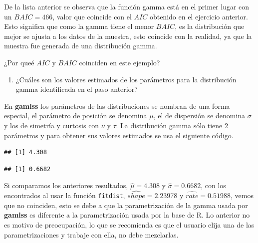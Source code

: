\documentclass[10pt,]{krantz}
\makeatletter
\newenvironment{Shaded}{\begin{snugshade}}{\end{snugshade}}
\newcommand{\NormalTok}[1]{{#1}}
\providecommand{\tightlist}{%
  \setlength{\itemsep}{0pt}\setlength{\parskip}{0pt}}
\let\proglang=\textsf
\newenvironment{kframe}{%
\medskip{}
\setlength{\fboxsep}{.8em}
 \def\at@end@of@kframe{}%
 \ifinner\ifhmode%
  \def\at@end@of@kframe{\end{minipage}}%
  \begin{minipage}{\columnwidth}%
 \fi\fi%
 \def\FrameCommand##1{\hskip\@totalleftmargin \hskip-\fboxsep
 \colorbox{shadecolor}{##1}\hskip-\fboxsep
     \hskip-\linewidth \hskip-\@totalleftmargin \hskip\columnwidth}%
 \MakeFramed {\advance\hsize-\width
   \@totalleftmargin\z@ \linewidth\hsize
   \@setminipage}}%
 {\par\unskip\endMakeFramed%
 \at@end@of@kframe}
\renewenvironment{Shaded}{\begin{kframe}}{\end{kframe}}
\makeatother
\begin{document}
De la lista anterior se observa que la función gamma está en el primer
lugar con un \(BAIC=466\), valor que coincide con el \(AIC\) obtenido en
el ejercicio anterior. Esto significa que como la gamma tiene el menor
\(BAIC\), es la distribución que mejor se ajusta a los datos de la
muestra, esto coincide con la realidad, ya que la muestra fue generada
de una distribución gamma.

¿Por queé \(AIC\) y \(BAIC\) coinciden en este ejemplo?

\begin{enumerate}
\def\labelenumi{\arabic{enumi})}
\setcounter{enumi}{1}
\tightlist
\item
  ¿Cuáles son los valores estimados de los parámetros para la
  distribución gamma identificada en el paso anterior?
\end{enumerate}

En \textbf{gamlss} los parámetros de las distribuciones se nombran de
una forma especial, el parámetro de posición se denomina \(\mu\), el de
dispersión se denomina \(\sigma\) y los de simetría y curtosis con
\(\nu\) y \(\tau\). La distribución gamma sólo tiene 2 parámetros y para
obtener sus valores estimados se usa el siguiente código.

\begin{Shaded}
\end{Shaded}

\begin{verbatim}
## [1] 4.308
\end{verbatim}

\begin{Shaded}
\end{Shaded}

\begin{verbatim}
## [1] 0.6682
\end{verbatim}

Si comparamos los anteriores resultados, \(\hat{\mu}= 4.308\) y
\(\hat{\sigma}=0.6682\), con los encontrados al usar la función
\texttt{fitdist}, \(\widehat{shape}=2.23978\) y
\(\widehat{rate}=0.51988\), vemos que no coinciden, esto se debe a que
la parametrización de la gamma usada por \textbf{gamlss} es diferente a
la parametrización usada por la base de \proglang{R}. Lo anterior no es
motivo de preocupación, lo que se recomienda es que el usuario elija una
de las parametrizaciones y trabaje con ella, no debe mezclarlas.
\end{document}
